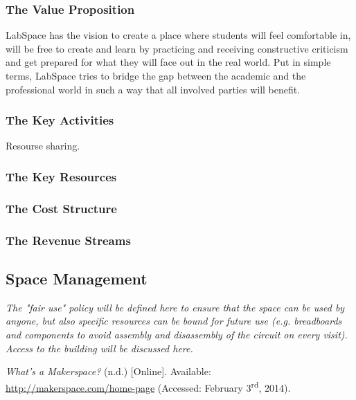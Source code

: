 \documentclass[a4paper, 11pt]{article}
\begin{document}
\subsubsection{The Value Proposition}

LabSpace has the vision to create a place where students will feel comfortable in, will be free to create and learn by practicing and receiving constructive criticism and get prepared for what they will face out in the real world. Put in simple terms, LabSpace tries to bridge the gap between the academic and the professional world in such a way that all involved parties will benefit. 

\subsubsection{The Key Activities} \label{sec:bm_activities}
Resourse sharing.

\subsubsection{The Key Resources} \label{sec:bm_res}

\subsubsection{The Cost Structure}

\subsubsection{The Revenue Streams}


\subsection{Space Management}
\textit{The "fair use" policy will be defined here to ensure that the space can be used by anyone, but also specific resources can be bound for future use (e.g. breadboards and components to avoid assembly and disassembly of the circuit on every visit). Access to the building will be discussed here.}

\newpage

\begin{thebibliography}{9}
     \emph{What’s a Makerspace?} (n.d.) [Online]. Available: \\ \href{http://makerspace.com/home-page}{http://makerspace.com/home-page} (Accessed: February 3\textsuperscript{rd}, 2014).
\end{thebibliography}
\end{document}

